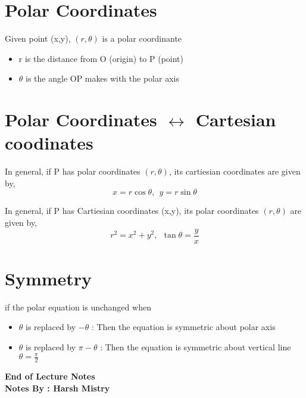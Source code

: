 \documentclass{article}
\begin{document}
\section{Polar Coordinates}
Given point (x,y), \((r, \theta)\) is a polar coordinante\\
\begin{itemize}
\item r is the distance from O (origin) to P (point) 
\item \(\theta\) is the angle OP makes with the polar axis 
\end{itemize}

\section{Polar Coordinates \(\longleftrightarrow\) Cartesian coodinates}
In general, if P has polar coordinates \((r,\theta)\), its cartiesian coordinates are given by, 
$$ x = r \cos \theta  ,\ \ y = r \sin \theta $$

In general, if P has Cartiesian coordinates (x,y), its polar coordinates \((r,\theta)\) are given by, 
$$ r^2 = x^2 + y^2,\ \ \tan \theta = \frac{y}{x}$$

\section{Symmetry}
if the polar equation is unchanged when 
\begin{itemize}
\item  \(\theta\) is replaced by \(-\theta\) : Then the equation is symmetric about polar axis
\item \(\theta\) is replaced by \(\pi - \theta\) : Then the equation is symmetric about vertical line \(\theta = \frac{\pi}{2}\) 
\end{itemize}

\begin{center}
\textbf{End of Lecture Notes} \\
\textbf{Notes By : Harsh Mistry}
\end{center}
\end{document}
